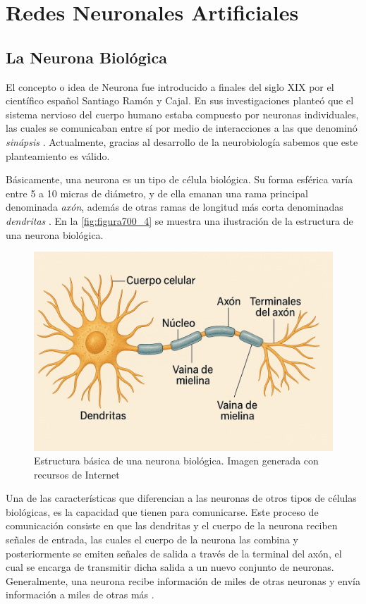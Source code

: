 {\section{Redes Neuronales Artificiales}

\subsection{La Neurona Biológica}

El concepto o idea de Neurona fue introducido a finales del siglo XIX por el científico español Santiago Ramón y Cajal. En sus investigaciones planteó que el sistema nervioso del cuerpo humano estaba compuesto por neuronas 
individuales, las cuales se comunicaban entre sí por medio de interacciones a las que denominó \textit{sinápsis} \cite{caicedoANN}. Actualmente, gracias al desarrollo de la neurobiología sabemos que este planteamiento es 
válido.

Básicamente, una neurona es un tipo de célula biológica. Su forma esférica varía entre 5 a 10 micras de diámetro, y de ella emanan una rama principal denominada \textit{axón}, además de otras ramas de longitud más corta 
denominadas \textit{dendritas} \cite{caicedoANN}. En la \autoref{fig:figura700_4} se muestra una ilustración de la estructura de una neurona biológica.

\begin{figure}[h]
	\centering
	\includegraphics[scale=0.2]{imgss214.png}
	\caption{Estructura básica de una neurona biológica. Imagen generada con recursos de Internet}
	\label{fig:figura700_4}
\end{figure}

Una de las características que diferencian a las neuronas de otros tipos de células biológicas, es la capacidad que tienen para comunicarse. Este proceso de comunicación consiste en que las dendritas y el cuerpo de la neurona 
reciben señales de entrada, las cuales el cuerpo de la neurona las combina y posteriormente se emiten señales de salida a través de la terminal del axón, el cual se encarga de transmitir dicha salida a un nuevo conjunto de
neuronas. Generalmente, una neurona recibe información de miles de otras neuronas y envía información a miles de otras más \cite{caicedoANN}.

}
